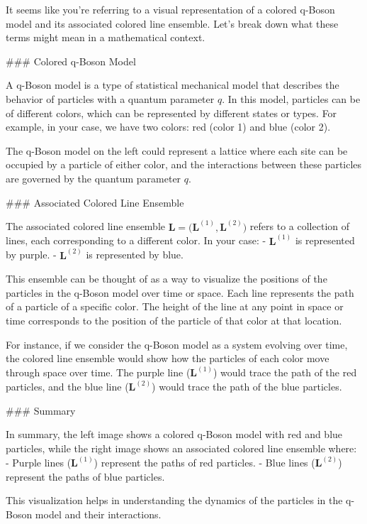 It seems like you're referring to a visual representation of a colored q-Boson model and its associated colored line ensemble. Let's break down what these terms might mean in a mathematical context.

### Colored q-Boson Model

A q-Boson model is a type of statistical mechanical model that describes the behavior of particles with a quantum parameter \( q \). In this model, particles can be of different colors, which can be represented by different states or types. For example, in your case, we have two colors: red (color 1) and blue (color 2).

The q-Boson model on the left could represent a lattice where each site can be occupied by a particle of either color, and the interactions between these particles are governed by the quantum parameter \( q \).

### Associated Colored Line Ensemble

The associated colored line ensemble \(\bm{L} = \big( \bm{L}^{(1)}, \bm{L}^{(2)} \big)\) refers to a collection of lines, each corresponding to a different color. In your case:
- \(\bm{L}^{(1)}\) is represented by purple.
- \(\bm{L}^{(2)}\) is represented by blue.

This ensemble can be thought of as a way to visualize the positions of the particles in the q-Boson model over time or space. Each line represents the path of a particle of a specific color. The height of the line at any point in space or time corresponds to the position of the particle of that color at that location.

For instance, if we consider the q-Boson model as a system evolving over time, the colored line ensemble would show how the particles of each color move through space over time. The purple line (\(\bm{L}^{(1)}\)) would trace the path of the red particles, and the blue line (\(\bm{L}^{(2)}\)) would trace the path of the blue particles.

### Summary

In summary, the left image shows a colored q-Boson model with red and blue particles, while the right image shows an associated colored line ensemble where:
- Purple lines (\(\bm{L}^{(1)}\)) represent the paths of red particles.
- Blue lines (\(\bm{L}^{(2)}\)) represent the paths of blue particles.

This visualization helps in understanding the dynamics of the particles in the q-Boson model and their interactions.